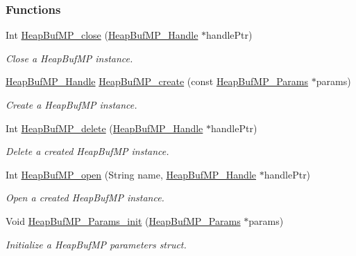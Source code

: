 \subsubsection*{Functions}
\begin{DoxyCompactItemize}
\item 
Int \hyperlink{_heap_buf_m_p_8h_a53c73d33bd195e23cd90c83a147b330f}{HeapBufMP\_\-close} (\hyperlink{_heap_buf_m_p_8h_a0dc02cca2abd71fa48bfaf79c1c09ca3}{HeapBufMP\_\-Handle} $\ast$handlePtr)
\begin{DoxyCompactList}\small\item\em Close a HeapBufMP instance. \item\end{DoxyCompactList}\item 
\hyperlink{_heap_buf_m_p_8h_a0dc02cca2abd71fa48bfaf79c1c09ca3}{HeapBufMP\_\-Handle} \hyperlink{_heap_buf_m_p_8h_a3bb1b659403d9944bc4b64596b20f1f3}{HeapBufMP\_\-create} (const \hyperlink{struct_heap_buf_m_p___params}{HeapBufMP\_\-Params} $\ast$params)
\begin{DoxyCompactList}\small\item\em Create a HeapBufMP instance. \item\end{DoxyCompactList}\item 
Int \hyperlink{_heap_buf_m_p_8h_aff10f0e0fc4ec4b88adb2b7422955f96}{HeapBufMP\_\-delete} (\hyperlink{_heap_buf_m_p_8h_a0dc02cca2abd71fa48bfaf79c1c09ca3}{HeapBufMP\_\-Handle} $\ast$handlePtr)
\begin{DoxyCompactList}\small\item\em Delete a created HeapBufMP instance. \item\end{DoxyCompactList}\item 
Int \hyperlink{_heap_buf_m_p_8h_a826facae0861c09d545f18dd503f0f0f}{HeapBufMP\_\-open} (String name, \hyperlink{_heap_buf_m_p_8h_a0dc02cca2abd71fa48bfaf79c1c09ca3}{HeapBufMP\_\-Handle} $\ast$handlePtr)
\begin{DoxyCompactList}\small\item\em Open a created HeapBufMP instance. \item\end{DoxyCompactList}\item 
Void \hyperlink{_heap_buf_m_p_8h_a81700157982b86ed3aefc72c6f3a7a5f}{HeapBufMP\_\-Params\_\-init} (\hyperlink{struct_heap_buf_m_p___params}{HeapBufMP\_\-Params} $\ast$params)
\begin{DoxyCompactList}\small\item\em Initialize a HeapBufMP parameters struct. \item\end{DoxyCompactList}\item 

\end{DoxyCompactItemize}
